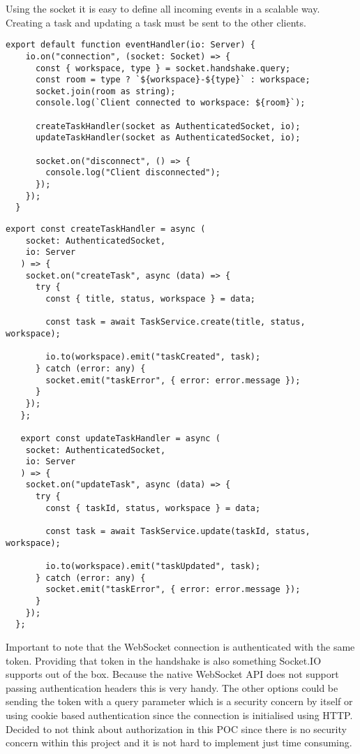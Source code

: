 Using the socket it is easy to define all incoming events in a scalable way. Creating a task and updating a task must be sent to the other clients.

\begin{lstlisting}[caption=WebSocket connection event handler]
  export default function eventHandler(io: Server) {
    io.on("connection", (socket: Socket) => {
      const { workspace, type } = socket.handshake.query;
      const room = type ? `${workspace}-${type}` : workspace;
      socket.join(room as string);
      console.log(`Client connected to workspace: ${room}`);
   
      createTaskHandler(socket as AuthenticatedSocket, io);
      updateTaskHandler(socket as AuthenticatedSocket, io);
   
      socket.on("disconnect", () => {
        console.log("Client disconnected");
      });
    });
  }
\end{lstlisting}

\begin{lstlisting}[caption=WebSocket task events handlers]
  export const createTaskHandler = async (
    socket: AuthenticatedSocket,
    io: Server
   ) => {
    socket.on("createTask", async (data) => {
      try {
        const { title, status, workspace } = data;
   
        const task = await TaskService.create(title, status, workspace);
   
        io.to(workspace).emit("taskCreated", task);
      } catch (error: any) {
        socket.emit("taskError", { error: error.message });
      }
    });
   };
   
   export const updateTaskHandler = async (
    socket: AuthenticatedSocket,
    io: Server
   ) => {
    socket.on("updateTask", async (data) => {
      try {
        const { taskId, status, workspace } = data;
   
        const task = await TaskService.update(taskId, status, workspace);
   
        io.to(workspace).emit("taskUpdated", task);
      } catch (error: any) {
        socket.emit("taskError", { error: error.message });
      }
    });
  };
\end{lstlisting}

Important to note that the WebSocket connection is authenticated with the same token. Providing that token in the handshake is also something Socket.IO supports out of the box. Because the native WebSocket API does not support passing authentication headers this is very handy. The other options could be sending the token with a query parameter which is a security concern by itself or using cookie based authentication since the connection is initialised using HTTP. Decided to not think about authorization in this POC since there is no security concern within this project and it is not hard to implement just time consuming.

